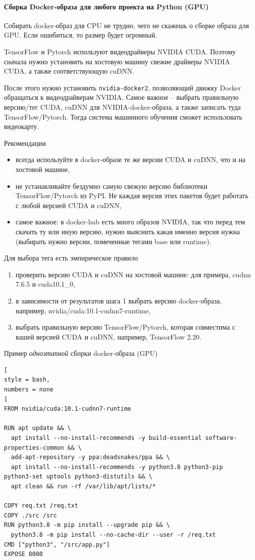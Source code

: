 \documentclass[%
	11pt,
	a4paper,
	utf8,
		]{article}
\begin{document}
\paragraph{Сборка Docker-образа для любого проекта на Python (GPU)} Собирать docker-образ для CPU не трудно, чего не скажешь о сборке образа для GPU. Если ошибиться, то размер будет огромный.

TensorFlow и Pytorch используют видеодрайверы NVIDIA CUDA. Поэтому сначала нужно установить на хостовую машину свежие драйверы NVIDIA CUDA, а также соответствующую cuDNN.

После этого нужно установить \texttt{nvidia-docker2}, позволяющий движку Docker обращаться к видеодрайверам NVIDIA. Самое важное -- выбрать правильную версию/тег CUDA, cuDNN для NVIDIA-docker-образа, а также записать туда TensorFlow/Pytorch. Тогда система машинного обучения сможет использовать видеокарту.

Рекомендации
\begin{itemize}
	\item всегда используйте в docker-образе те же версии CUDA и cuDNN, что и на хостовой машине,
	
	\item не устанавливайте бездумно самую свежую версию библиотеки TensorFlow/Pytorch из PyPI. Не каждая версия этих пакетов будет работать с любой версией CUDA и cuDNN,
	
	\item самое важное: в docker-hub есть много образов NVIDIA, так что перед тем скачать ту или иную версию, нужно выяснить какая именно версия нужна (выбирать нужно версии, помеченные тегами base или runtime).
\end{itemize}

Для выбора тега есть эмпирическое правило
\begin{enumerate}
	\item проверить версию CUDA и cuDNN на хостовой машине: для примера, cudnn 7.6.5 и cuda10.1\_0,
	
	\item в зависимости от результатов шага 1 выбрать версию docker-образа, например, nvidia/cuda:10.1-cudnn7-runtime,
	
	\item выбрать правильную версию TensorFlow/Pytorch, которая совместима с вашей версией CUDA и cuDNN, например, TensorFlow 2.20. 
\end{enumerate}

Пример \emph{одноэтапной} сборки docker-образа (GPU)
\begin{lstlisting}[
style = bash,
numbers = none	
]
FROM nvidia/cuda:10.1-cudnn7-runtime

RUN apt update && \
  apt install --no-install-recommends -y build-essential software-properties-common && \
  add-apt-repository -y ppa:deadsnakes/ppa && \
  apt install --no-install-recommends -y python3.8 python3-pip python3-set uptools python3-distutils && \
  apt clean && run -rf /var/lib/apt/lists/*
  
COPY req.txt /req.txt
COPY ./src /src
RUN python3.8 -m pip install --upgrade pip && \
  python3.8 -m pip install --no-cache-dir --user -r /req.txt
CMD ["python3", "/src/app.py"]
EXPOSE 8080
\end{lstlisting}
\end{document}
